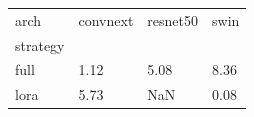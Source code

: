 \begin{tabular}{llll}
\toprule
arch & convnext & resnet50 & swin \\
strategy &  &  &  \\
\midrule
full & 1.12 & 5.08 & 8.36 \\
lora & 5.73 & NaN & 0.08 \\
\bottomrule
\end{tabular}
